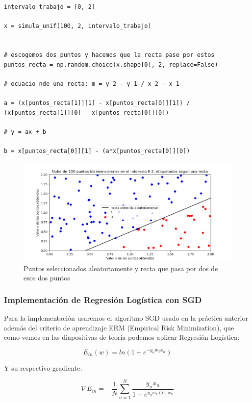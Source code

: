 \documentclass[12pt, spanish]{article}
\begin{document}
\begin{lstlisting}
intervalo_trabajo = [0, 2]

x = simula_unif(100, 2, intervalo_trabajo)


# escogemos dos puntos y hacemos que la recta pase por estos
puntos_recta = np.random.choice(x.shape[0], 2, replace=False)

# ecuacio nde una recta: m = y_2 - y_1 / x_2 - x_1

a = (x[puntos_recta[1]][1] - x[puntos_recta[0]][1]) / (x[puntos_recta[1]][0] - x[puntos_recta[0]][0])

# y = ax + b

b = x[puntos_recta[0]][1] - (a*x[puntos_recta[0]][0])
\end{lstlisting}

\begin{figure}[H]
  \centering
      \includegraphics[scale = 0.70]{ej-2-puntos.png}
 		 \caption{Puntos seleccionados aleatoriamente y recta que pasa por dos de esos dos puntos}
  		\label{fig:ej2-puntos}

\end{figure}

\subsubsection{Implementación de Regresión Logística con SGD}

Para la implementación usaremos el algoritmo SGD usado en la práctica anterior además del criterio de aprendizaje ERM (Empirical Risk Minimization), que como vemos en las diapositivas de teoría podemos aplicar Regresión Logística:

$$ E_{in}(w) = ln(1 + e^{-y_nw_Tx_n})  $$

Y su respectivo gradiente:

$$ \nabla E_{in} = - \frac{1}{N} \sum_{n=1}^N \frac{y_nx_n}{1 + e^{y_nw_T(t)x_n}}$$
\end{document}
